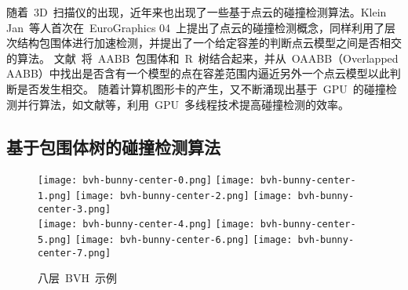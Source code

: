 随着~3D~扫描仪的出现，近年来也出现了一些基于点云的碰撞检测算法。Klein Jan~等人\cite{klein2004point}首次在~EuroGraphics 04~上提出了点云的碰撞检测概念，同样利用了层次结构包围体进行加速检测，并提出了一个给定容差的判断点云模型之间是否相交的算法。
文献~将~AABB~包围体和~R~树结合起来，并从~OAABB（Overlapped AABB）中找出是否含有一个模型的点在容差范围内逼近另外一个点云模型以此判断是否发生相交。
随着计算机图形卡的产生，又不断涌现出基于~GPU~的碰撞检测并行算法，如文献等，利用~GPU~多线程技术提高碰撞检测的效率。

\subsection{基于包围体树的碰撞检测算法}
\label{sec:cd-bvh}

\begin{figure}[htbp]
  \begin{center}
  \begin{boxedminipage}{0.87\textwidth}
  \subcaptionbox*{\label{lbl:bvh-bunny-center-0.png}}
    {\texttt{[image: bvh-bunny-center-0.png]}}
  \subcaptionbox*{\label{lbl:bvh-bunny-center-1.png}}
    {\texttt{[image: bvh-bunny-center-1.png]}}
  \subcaptionbox*{\label{lbl:bvh-bunny-center-2.png}}
    {\texttt{[image: bvh-bunny-center-2.png]}}
  \subcaptionbox*{\label{lbl:bvh-bunny-center-3.png}}
    {\texttt{[image: bvh-bunny-center-3.png]}}
    \vspace{-0.3cm}
  \\\hspace{0.5cm} 
  \subcaptionbox*{\label{lbl:bvh-bunny-center-4.png}}
    {\texttt{[image: bvh-bunny-center-4.png]}}
  \subcaptionbox*{\label{lbl:bvh-bunny-center-5.png}}
    {\texttt{[image: bvh-bunny-center-5.png]}}
  \subcaptionbox*{\label{lbl:bvh-bunny-center-6.png}}
    {\texttt{[image: bvh-bunny-center-6.png]}}
  \subcaptionbox*{\label{lbl:bvh-bunny-center-7.png}}
    {\texttt{[image: bvh-bunny-center-7.png]}}
  \vspace{-0.5cm}
  \end{boxedminipage}
\caption{八层~BVH~示例}
\label{lbl:bvh-example}
\end{center}
\end{figure}

